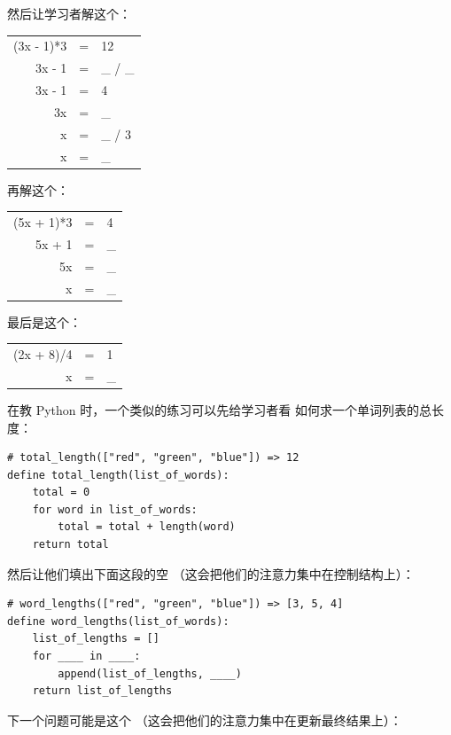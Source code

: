 \noindent
然后让学习者解这个：

\begin{center}
\begin{tabular}{rcl}
  (3x - 1)*3	& = &	12	\\
  3x - 1	& = &	\_ / \_	\\
  3x - 1	& = &	4	\\
  3x		& = &	\_	\\
  x		& = &	\_ / 3	\\
  x		& = &	\_
\end{tabular}
\end{center}

\noindent
再解这个：

\begin{center}
\begin{tabular}{rcl}
  (5x + 1)*3	& = &	4	\\
  5x + 1	& = &	\_ 	\\
  5x		& = &	\_ 	\\
  x		& = &	\_
\end{tabular}
\end{center}

\noindent
最后是这个：

\begin{center}
\begin{tabular}{rcl}
  (2x + 8)/4	& = &	1	\\
   x		& = &	\_
\end{tabular}
\end{center}

在教 Python 时，一个类似的练习可以先给学习者看
如何求一个单词列表的总长度：

\begin{verbatim}
# total_length(["red", "green", "blue"]) => 12
define total_length(list_of_words):
    total = 0
    for word in list_of_words:
        total = total + length(word)
    return total
\end{verbatim}

\noindent
然后让他们填出下面这段的空
（这会把他们的注意力集中在控制结构上）：

\begin{verbatim}
# word_lengths(["red", "green", "blue"]) => [3, 5, 4]
define word_lengths(list_of_words):
    list_of_lengths = []
    for ____ in ____:
        append(list_of_lengths, ____)
    return list_of_lengths
\end{verbatim}

下一个问题可能是这个
（这会把他们的注意力集中在更新最终结果上）：

